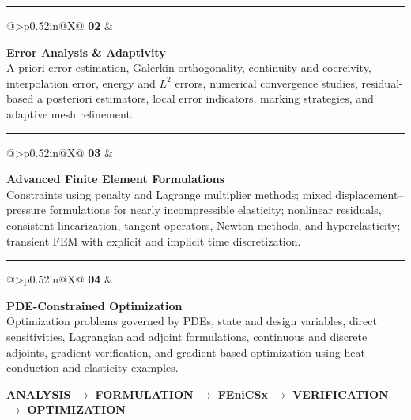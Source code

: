 \documentclass[11pt]{article}
\makeatletter
\newcommand{\partrow}[4]{%
  \begin{tabularx}{\textwidth}{@{}>{\raggedleft\arraybackslash}p{0.52in}@{\hspace{0.18in}}X@{}}
  {\fontsize{23}{23}\selectfont\bfseries\textcolor{#1}{#2}} &
  \begin{minipage}[t]{\linewidth}
    {\fontsize{15}{17}\selectfont\bfseries\textcolor{MinesNavy}{#3}}\\[-1pt]
    {\fontsize{10.6}{13.1}\selectfont\color{WarmGray}#4}
  \end{minipage}
  \end{tabularx}
}
\makeatother
\begin{document}
\vspace{0.04in}\textcolor{LightRule}{\rule{\textwidth}{0.45pt}}\vspace{0.065in}

\partrow{CEADGreen}{02}{Error Analysis \& Adaptivity}{
A priori error estimation, Galerkin orthogonality, continuity and coercivity, interpolation error, energy and $L^2$ errors, numerical convergence studies, residual-based a posteriori estimators, local error indicators, marking strategies, and adaptive mesh refinement.}

\vspace{0.04in}\textcolor{LightRule}{\rule{\textwidth}{0.45pt}}\vspace{0.065in}

\partrow{MinesNavy}{03}{Advanced Finite Element Formulations}{
Constraints using penalty and Lagrange multiplier methods; mixed displacement--pressure formulations for nearly incompressible elasticity; nonlinear residuals, consistent linearization, tangent operators, Newton methods, and hyperelasticity; transient FEM with explicit and implicit time discretization.}

\vspace{0.04in}\textcolor{LightRule}{\rule{\textwidth}{0.45pt}}\vspace{0.065in}

\partrow{CEADTeal}{04}{PDE-Constrained Optimization}{
Optimization problems governed by PDEs, state and design variables, direct sensitivities, Lagrangian and adjoint formulations, continuous and discrete adjoints, gradient verification, and gradient-based optimization using heat conduction and elasticity examples.}

\vspace{0.13in}
\begin{center}
{\fontsize{10.2}{12}\selectfont\bfseries\textcolor{MinesNavy}{ANALYSIS}}
\hspace{0.11in}\textcolor{CEADTeal}{\large$\rightarrow$}\hspace{0.11in}
{\fontsize{10.2}{12}\selectfont\bfseries\textcolor{MinesNavy}{FORMULATION}}
\hspace{0.11in}\textcolor{CEADTeal}{\large$\rightarrow$}\hspace{0.11in}
{\fontsize{10.2}{12}\selectfont\bfseries\textcolor{MinesNavy}{FEniCSx}}
\hspace{0.11in}\textcolor{CEADTeal}{\large$\rightarrow$}\hspace{0.11in}
{\fontsize{10.2}{12}\selectfont\bfseries\textcolor{MinesNavy}{VERIFICATION}}
\hspace{0.11in}\textcolor{CEADTeal}{\large$\rightarrow$}\hspace{0.11in}
{\fontsize{10.2}{12}\selectfont\bfseries\textcolor{MinesNavy}{OPTIMIZATION}}
\end{center}
\end{document}

